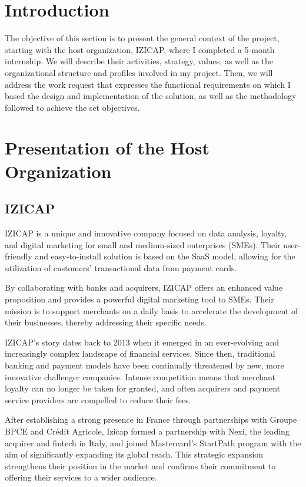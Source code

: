 \section{Introduction}
The objective of this section is to present the general context of the project, starting with the host organization, IZICAP, where I completed a 5-month internship. We will describe their activities, strategy, values, as well as the organizational structure and profiles involved in my project. Then, we will address the work request that expresses the functional requirements on which I based the design and implementation of the solution, as well as the methodology followed to achieve the set objectives.

\section{Presentation of the Host Organization}
\subsection{IZICAP}
IZICAP is a unique and innovative company focused on data analysis, loyalty, and digital marketing for small and medium-sized enterprises (SMEs). Their user-friendly and easy-to-install solution is based on the SaaS model, allowing for the utilization of customers' transactional data from payment cards.

By collaborating with banks and acquirers, IZICAP offers an enhanced value proposition and provides a powerful digital marketing tool to SMEs. Their mission is to support merchants on a daily basis to accelerate the development of their businesses, thereby addressing their specific needs.

IZICAP's story dates back to 2013 when it emerged in an ever-evolving and increasingly complex landscape of financial services. Since then, traditional banking and payment models have been continually threatened by new, more innovative challenger companies. Intense competition means that merchant loyalty can no longer be taken for granted, and often acquirers and payment service providers are compelled to reduce their fees.

After establishing a strong presence in France through partnerships with Groupe BPCE and Crédit Agricole, Izicap formed a partnership with Nexi, the leading acquirer and fintech in Italy, and joined Mastercard's StartPath program with the aim of significantly expanding its global reach. This strategic expansion strengthens their position in the market and confirms their commitment to offering their services to a wider audience.

